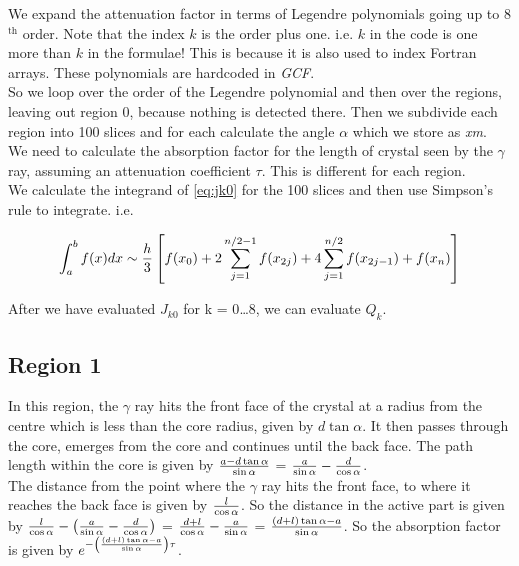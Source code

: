 \noindent We expand the attenuation factor in terms of Legendre
polynomials going up to 8$^\textrm{th}$ order. Note that the index $k$
is the order plus one. i.e. $k$ in the code is one more than $k$ in
the formulae! This is because it is also used to index Fortran arrays.
These polynomials are hardcoded in \emph{GCF}.\\

\noindent So we loop over the order of the Legendre polynomial and
then over the regions, leaving out region 0, because nothing is
detected there. Then we subdivide each region into 100 slices and for
each calculate the angle $\alpha$ which we store as \emph{xm}.\\

\noindent We need to calculate the absorption factor for the length of
crystal seen by the $\gamma$ ray, assuming an attenuation coefficient
$\tau$. This is different for each region.\\

\noindent We calculate the integrand of \ref{eq:jk0} for the 100
slices and then use Simpson's rule to integrate. i.e.

\begin{equation}
\int_a^b f(x) dx \sim {h \over 3}
\left[
f(x_0)
+ 2 \displaystyle\sum_{j = 1}^{n/2 - 1} f(x_{2j})
+ 4 \displaystyle\sum_{j = 1}^{n/2} f(x_{2j-1})
+ f(x_n)
\right]
\end{equation}

\noindent After we have evaluated $J_{k0}$ for k = 0{\ldots}8, we can
evaluate $Q_k$.

\subsection{Region 1}

\noindent In this region, the $\gamma$ ray hits the front face of the
crystal at a radius from the centre which is less than the core
radius, given by $d\tan\alpha$. It then passes through the core,
emerges from the core and continues until the back face. The path length
within the core is given by $a - d\tan\alpha\over\sin\alpha$ = 
${a\over\sin\alpha} - {d\over\cos\alpha}$.\\

\noindent The distance from the point where the $\gamma$ ray hits the
front face, to where it reaches the back face is given by $l \over
\cos\alpha$. So the distance in the active part is given by
${l \over \cos\alpha} - \left({a\over\sin\alpha} -
{d\over\cos\alpha}\right)$ =
${d + l \over \cos\alpha} - {a\over\sin\alpha}$ = 
${(d + l) \tan\alpha - a \over \sin\alpha}$. So the absorption factor
is given by $e^{-{\left((d + l) \tan\alpha - a \over
\sin\alpha\right)\tau}}$.


